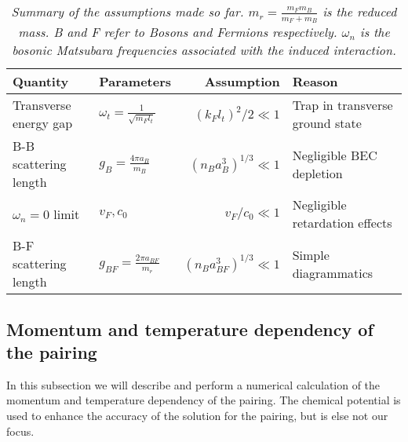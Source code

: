 \begin{table}[htb]
\centering
\caption{\textit{Summary of the assumptions made so far. $m_r = \frac{m_Fm_B}{m_F+m_B}$ is the reduced mass. B and F refer to Bosons and Fermions respectively. $\omega_n$ is the bosonic Matsubara frequencies associated with the induced interaction.}}
\begin{tabular}{|l|l|r|l|}
\hline \textbf{Quantity} & \textbf{Parameters} 						& \textbf{Assumption}						& \textbf{Reason}	\\
\hline Transverse energy gap & $\omega_t = \frac{1}{\sqrt{m_Fl_t}}$ & $(k_Fl_t)^2/2 	\ll 1$ 					& Trap in transverse ground state \\
\hline B-B scattering length & $g_B = \frac{4\pi a_B}{m_B}$			& $(n_Ba_B^3)^{1/3}	\ll 1$					& Negligible BEC depletion  \\
\hline $\omega_n = 0$ limit  & $v_F,c_0$							& $v_F/c_0 \ll 1$ & Negligible retardation effects  \\
\hline B-F scattering length & $g_{BF} = \frac{2\pi a_{BF}}{m_r}$ 	& $(n_Ba_{BF}^3)^{1/3}	\ll 1$				& Simple diagrammatics\\
\hline 
\end{tabular}
\label{tab.assumptions}
\end{table}

\subsection{Momentum and temperature dependency of the pairing}
In this subsection we will describe and perform a numerical calculation of the momentum and temperature dependency of the pairing. The chemical potential is used to enhance the accuracy of the solution for the pairing, but is else not our focus. 

